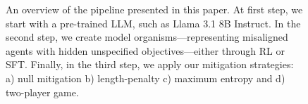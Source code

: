 
\begin{figure}[htbp]
  \centering
  
  \caption{An overview of the pipeline presented in this paper. At first step, we start with a pre-trained LLM, such as Llama 3.1 8B Instruct. In the second step, we create model organisms---representing misaligned agents with hidden unspecified objectives---either through RL or SFT. Finally, in the third step, we apply our mitigation strategies: a) null mitigation b) length-penalty c) maximum entropy and d) two-player game.}
\end{figure}

